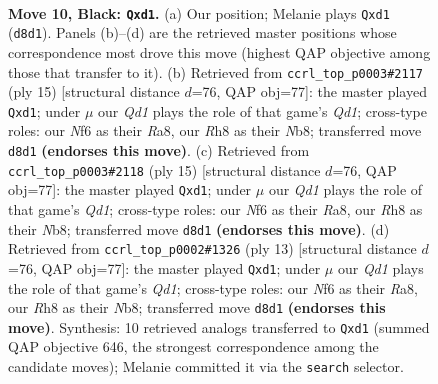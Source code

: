 \documentclass[11pt]{article}
\begin{document}
\clearpage

\begin{figure}[p]\centering
\begin{subfigure}{0.46\textwidth}\centering
\resizebox{\linewidth}{!}{%
\newchessgame
\chessboard[
  setfen={rnbqkb1r/1p3ppp/4pn2/p1P3N1/2B4P/4P3/PP3P2/RNBQ1RK1 b kq - 0 10},
  showmover=false,
  pgfstyle=straightmove, color=movearrow, markmove={d8-d1}
]}
\caption{}
\end{subfigure}\hfill
\begin{subfigure}{0.46\textwidth}\centering
\resizebox{\linewidth}{!}{%
\newchessgame
\chessboard[
  setfen={rnbqkb1r/1p3ppp/p3pn2/2P5/2B5/4PN2/PP3PPP/RNBQ1RK1 b kq - 0 8},
  showmover=false,
  pgfstyle=straightmove, color=movearrow, markmove={d8-d1}
]}
\caption{}
\end{subfigure}
\\[4pt]
\begin{subfigure}{0.46\textwidth}\centering
\resizebox{\linewidth}{!}{%
\newchessgame
\chessboard[
  setfen={rnbqkb1r/1p3ppp/p3pn2/2P5/2B5/4PN2/PP3PPP/RNBQ1RK1 b kq - 0 8},
  showmover=false,
  pgfstyle=straightmove, color=movearrow, markmove={d8-d1}
]}
\caption{}
\end{subfigure}\hfill
\begin{subfigure}{0.46\textwidth}\centering
\resizebox{\linewidth}{!}{%
\newchessgame
\chessboard[
  setfen={rnbqkb1r/1p3ppp/p3pn2/2P5/2B5/4PN2/PP3PPP/RNBQ1RK1 b kq - 0 7},
  showmover=false,
  pgfstyle=straightmove, color=movearrow, markmove={d8-d1}
]}
\caption{}
\end{subfigure}
\caption{\textbf{Move 10, Black: \texttt{Qxd1}.} (a) Our position; Melanie plays \texttt{Qxd1} (\texttt{d8d1}). Panels (b)--(d) are the retrieved master positions whose correspondence most drove this move (highest QAP objective among those that transfer to it). (b) Retrieved from \texttt{ccrl\_top\_p0003\#2117} (ply 15) [structural distance $d$=76, QAP obj=77]: the master played \texttt{Qxd1}; under $\mu$ our \emph{Qd1} plays the role of that game's \emph{Qd1}; cross-type roles: our \emph{N}f6 as their \emph{R}a8, our \emph{R}h8 as their \emph{N}b8; transferred move \texttt{d8d1} \textbf{(endorses this move)}. (c) Retrieved from \texttt{ccrl\_top\_p0003\#2118} (ply 15) [structural distance $d$=76, QAP obj=77]: the master played \texttt{Qxd1}; under $\mu$ our \emph{Qd1} plays the role of that game's \emph{Qd1}; cross-type roles: our \emph{N}f6 as their \emph{R}a8, our \emph{R}h8 as their \emph{N}b8; transferred move \texttt{d8d1} \textbf{(endorses this move)}. (d) Retrieved from \texttt{ccrl\_top\_p0002\#1326} (ply 13) [structural distance $d$=76, QAP obj=77]: the master played \texttt{Qxd1}; under $\mu$ our \emph{Qd1} plays the role of that game's \emph{Qd1}; cross-type roles: our \emph{N}f6 as their \emph{R}a8, our \emph{R}h8 as their \emph{N}b8; transferred move \texttt{d8d1} \textbf{(endorses this move)}. Synthesis: 10 retrieved analogs transferred to \texttt{Qxd1} (summed QAP objective 646, the strongest correspondence among the candidate moves); Melanie committed it via the \texttt{search} selector.}
\label{fig:thought-m19}
\end{figure}
\end{document}
